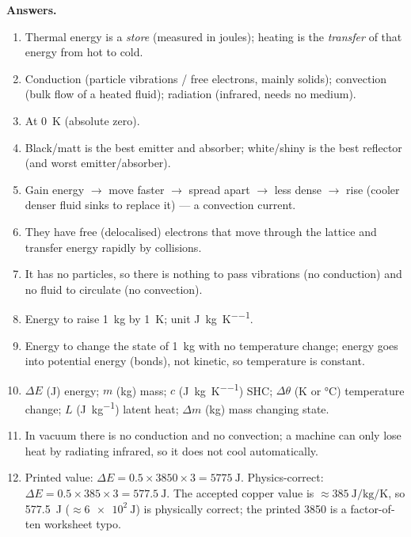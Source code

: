 \documentclass[11pt,a4paper]{article}
\newcommand{\dtheta}{\Delta\theta}
\newcommand{\dE}{\Delta E}
\begin{document}
\begin{plainbox}
\textbf{Answers.}
\begin{enumerate}[leftmargin=1.6em,itemsep=2pt]
\item Thermal energy is a \emph{store} (measured in joules); heating is the \emph{transfer}
      of that energy from hot to cold.
\item Conduction (particle vibrations / free electrons, mainly solids); convection (bulk
      flow of a heated fluid); radiation (infrared, needs no medium).
\item At \SI{0}{K} (absolute zero).
\item Black/matt is the best emitter and absorber; white/shiny is the best reflector (and
      worst emitter/absorber).
\item Gain energy $\to$ move faster $\to$ spread apart $\to$ less dense $\to$ rise (cooler
      denser fluid sinks to replace it) --- a convection current.
\item They have free (delocalised) electrons that move through the lattice and transfer
      energy rapidly by collisions.
\item It has no particles, so there is nothing to pass vibrations (no conduction) and no
      fluid to circulate (no convection).
\item Energy to raise \SI{1}{\kilogram} by \SI{1}{\kelvin}; unit
      \si{\joule\per\kilogram\per\kelvin}.
\item Energy to change the state of \SI{1}{\kilogram} with no temperature change; energy
      goes into potential energy (bonds), not kinetic, so temperature is constant.
\item $\dE$ (J) energy; $m$ (kg) mass; $c$ (\si{\joule\per\kilogram\per\kelvin}) SHC;
      $\dtheta$ (K or \si{\celsius}) temperature change; $L$
      (\si{\joule\per\kilogram}) latent heat; $\Delta m$ (kg) mass changing state.
\item In vacuum there is no conduction and no convection; a machine can only lose heat by
      radiating infrared, so it does not cool automatically.
\item Printed value: $\dE = 0.5\times3850\times3 = \SI{5775}{\joule}$. Physics-correct:
      $\dE = 0.5\times385\times3 = \SI{577.5}{\joule}$. The accepted copper value is
      $\approx\SI{385}{\joule\per\kilogram\per\kelvin}$, so \SI{577.5}{\joule}
      ($\approx\SI{6e2}{\joule}$) is physically correct; the printed \SI{3850}{} is a
      factor-of-ten worksheet typo.
\end{enumerate}
\end{plainbox}
\end{document}
